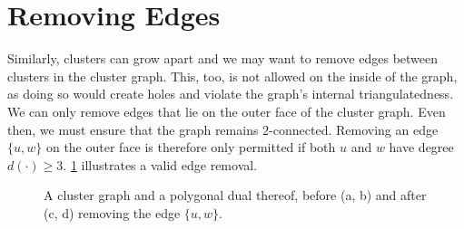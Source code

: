 \section{Removing Edges}
\label{sect:removing-edges}

Similarly, clusters can grow apart and we may want to remove edges between clusters in the cluster graph.
This, too, is not allowed on the inside of the graph, as doing so would create holes and violate the graph's internal triangulatedness. We can only remove edges that lie on the outer face of the cluster graph. Even then, we must ensure that the graph remains $2$-connected. Removing an edge $\{u,w\}$ on the outer face is therefore only permitted if both $u$ and $w$ have degree $d(\cdot) \geq 3$. \cref{fig:remove-outer-edge-example} illustrates a valid edge removal.

\begin{figure}[H]
	\centering
	\quad
	\qquad
	\quad
	\caption{A cluster graph and a polygonal dual thereof, before (a, b) and after (c, d) removing the edge $\{u,w\}$.}
	\label{fig:remove-outer-edge-example}
\end{figure}

\lipsum
